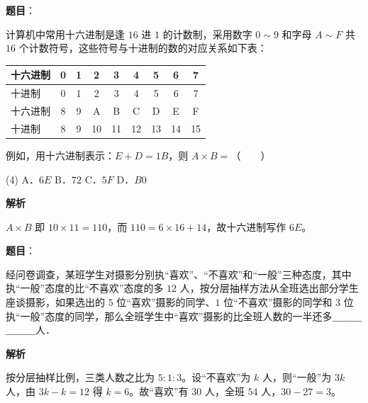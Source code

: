 \begin{answer}

\textbf{题目}：

计算机中常用十六进制是逢 $16$ 进 $1$ 的计数制，采用数字 $0 \sim 9$ 和字母 $A \sim F$ 共 $16$ 个计数符号，这些符号与十进制的数的对应关系如下表：

\begin{center}
\begingroup\setlength{\tabcolsep}{4pt}
\begin{tabular}{lcccccccc}
\toprule
十六进制 & 0 & 1 & 2 & 3 & 4 & 5 & 6 & 7 \\
\midrule
十进制 & 0 & 1 & 2 & 3 & 4 & 5 & 6 & 7 \\
十六进制 & 8 & 9 & A & B & C & D & E & F \\
十进制 & 8 & 9 & 10 & 11 & 12 & 13 & 14 & 15 \\
\bottomrule
\end{tabular}
\endgroup
\end{center}

例如，用十六进制表示：$E + D = 1B$，则 $A \times B =$\mbox{（　　）}

\begin{gkopts}(4)
\task A．$6E$
\task B．$72$
\task C．$5F$
\task D．$B0$
\end{gkopts}

\textbf{解析}

$A \times B$ 即 $10\times 11 = 110$，而 $110 = 6\times 16 + 14$，故十六进制写作 $6E$。


\end{answer}
\begin{answer}

\textbf{题目}：

经问卷调查，某班学生对摄影分别执“喜欢”、“不喜欢”和“一般”三种态度，其中执“一般”态度的比“不喜欢”态度的多 $12$ 人，按分层抽样方法从全班选出部分学生座谈摄影，如果选出的 $5$ 位“喜欢”摄影的同学、$1$ 位“不喜欢”摄影的同学和 $3$ 位执“一般”态度的同学，那么全班学生中“喜欢”摄影的比全班人数的一半还多＿＿＿＿＿＿人．

\textbf{解析}

按分层抽样比例，三类人数之比为 $5:1:3$。设“不喜欢”为 $k$ 人，则“一般”为 $3k$ 人，由 $3k - k = 12$ 得 $k = 6$。故“喜欢”有 $30$ 人，全班 $54$ 人，$30 - 27 = 3$。


\end{answer}
